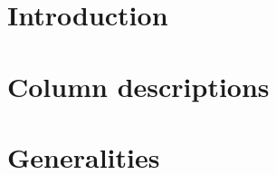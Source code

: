 
\section{Introduction}                   \label{rlp auth: intro}                           
\section{Column descriptions}            \label{rlp auth: column descriptions}             
\section{Generalities}                   \label{rlp auth: generalities}                    
